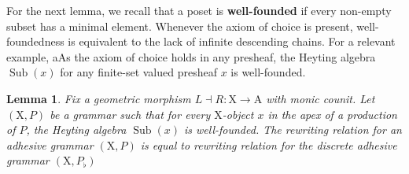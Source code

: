 \documentclass{amsart}
\newcommand{\A}{\cat{A}}
\newcommand{\X}{\cat{X}}
\newcommand{\cat}[1]{\mathrm{#1}}
\newcommand{\from}{\colon}
\DeclareMathOperator{\Sub}{Sub}
\newtheorem{lemma}[theorem]{Lemma}
\theoremstyle{remark}
\theoremstyle{definition}
\begin{document}
For the next lemma, we recall that a poset is \textbf{well-founded} if
every non-empty subset has a minimal element.  Whenever the axiom of
choice is present, well-foundedness is equivalent to the lack of
infinite descending chains. For a relevant example, aAs the axiom of
choice holds in any presheaf, the Heyting algebra $ \Sub ( x ) $ for
any finite-set valued presheaf $ x $ is well-founded.

\begin{lemma}
\label{lem:production-same-rewrite-relation-as-discrete}
Fix a geometric morphism $ L \dashv R \from \X \to \A $ with monic
counit. Let $ ( \X , P ) $ be a grammar such that for every
$ \X $-object $ x $ in the apex of a production of $ P $, the Heyting
algebra $ \Sub (x) $ is well-founded.  The rewriting relation for an
adhesive grammar $ ( \X , P ) $ is equal to rewriting relation for the
discrete adhesive grammar $ ( \X , P_{\flat} ) $
\end{lemma}
\end{document}
